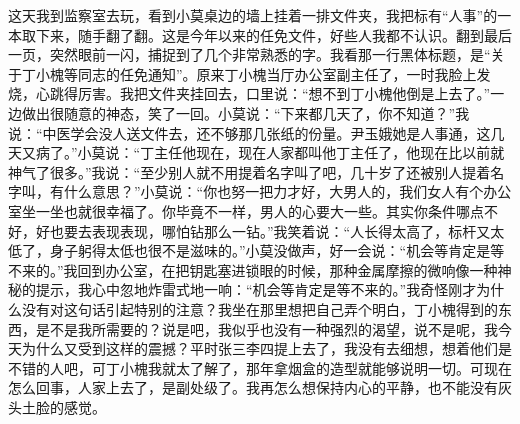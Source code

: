 \documentclass[12pt,oneside]{book}
\begin{document}
这天我到监察室去玩，看到小莫桌边的墙上挂着一排文件夹，我把标有``人事''的一本取下来，随手翻了翻。这是今年以来的任免文件，好些人我都不认识。翻到最后一页，突然眼前一闪，捕捉到了几个非常熟悉的字。我看那一行黑体标题，是``关于丁小槐等同志的任免通知''。原来丁小槐当厅办公室副主任了，一时我脸上发烧，心跳得厉害。我把文件夹挂回去，口里说：``想不到丁小槐他倒是上去了。''一边做出很随意的神态，笑了一回。小莫说：``下来都几天了，你不知道？''我说：``中医学会没人送文件去，还不够那几张纸的份量。尹玉娥她是人事通，这几天又病了。''小莫说：``丁主任他现在，现在人家都叫他丁主任了，他现在比以前就神气了很多。''我说：``至少别人就不用提着名字叫了吧，几十岁了还被别人提着名字叫，有什么意思？''小莫说：``你也努一把力才好，大男人的，我们女人有个办公室坐一坐也就很幸福了。你毕竟不一样，男人的心要大一些。其实你条件哪点不好，好也要去表现表现，哪怕钻那么一钻。''我笑着说：``人长得太高了，标杆又太低了，身子躬得太低也很不是滋味的。''小莫没做声，好一会说：``机会等肯定是等不来的。''我回到办公室，在把钥匙塞进锁眼的时候，那种金属摩擦的微响像一种神秘的提示，我心中忽地炸雷式地一响：``机会等肯定是等不来的。''我奇怪刚才为什么没有对这句话引起特别的注意？我坐在那里想把自己弄个明白，丁小槐得到的东西，是不是我所需要的？说是吧，我似乎也没有一种强烈的渴望，说不是呢，我今天为什么又受到这样的震撼？平时张三李四提上去了，我没有去细想，想着他们是不错的人吧，可丁小槐我就太了解了，那年拿烟盒的造型就能够说明一切。可现在怎么回事，人家上去了，是副处级了。我再怎么想保持内心的平静，也不能没有灰头土脸的感觉。
\end{document}
